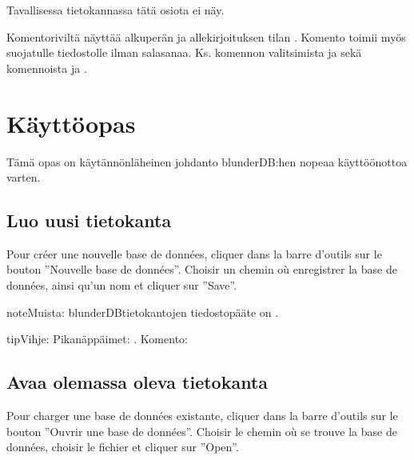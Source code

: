 \documentclass[letterpaper,10pt,finnish]{sphinxmanual}
\begin{document}
\sphinxAtStartPar
Tavallisessa tietokannassa tätä osiota ei näy.

\sphinxAtStartPar
Komentoriviltä  näyttää alkuperän ja allekirjoituksen tilan . Komento toimii myös suojatulle tiedostolle ilman salasanaa. Ks.  komennon  valitsimista  ja  sekä komennoista  ja .

\sphinxstepscope


\section{Käyttöopas}
\label{\detokenize{guide_utilisateur:guide-utilisateur}}\label{\detokenize{guide_utilisateur:id1}}\label{\detokenize{guide_utilisateur::doc}}
\sphinxAtStartPar
Tämä opas on käytännönläheinen johdanto blunderDB:hen nopeaa käyttöönottoa varten.


\subsection{Luo uusi tietokanta}
\label{\detokenize{guide_utilisateur:creer-une-nouvelle-base-de-donnees}}
\sphinxAtStartPar
Pour créer une nouvelle base de données, cliquer dans la barre d’outils sur le
bouton ”Nouvelle base de données”. Choisir un chemin où enregistrer la base de
données, ainsi qu’un nom et cliquer sur ”Save”.

\begin{sphinxadmonition}{note}{Muista:}
\sphinxAtStartPar
blunderDB\sphinxhyphen{}tietokantojen tiedostopääte on .
\end{sphinxadmonition}

\begin{sphinxadmonition}{tip}{Vihje:}
\sphinxAtStartPar
Pikanäppäimet: . Komento: 
\end{sphinxadmonition}


\subsection{Avaa olemassa oleva tietokanta}
\label{\detokenize{guide_utilisateur:ouvrir-une-base-de-donnee-existante}}
\sphinxAtStartPar
Pour charger une base de données existante, cliquer dans la barre d’outils sur
le bouton ”Ouvrir une base de données”. Choisir le chemin où se trouve la base
de données, choisir le fichier  et cliquer sur ”Open”.
\end{document}
